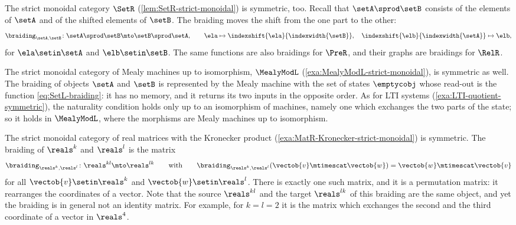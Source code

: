 \begin{example}
    \label{exa:SetR-symmetric}
    The strict monoidal category $\SetR$ (\cref{lem:SetR-strict-monoidal}) is symmetric, too.
    Recall that $\setA \sprod \setB$ consists of the elements of $\setA$ and of the shifted elements of $\setB$.
    The braiding moves the shift from the one part to the other:
    \begin{equation}
        \label{eq:SetR-braiding}
        \braiding_{\setA,\setB} \colon \setA \sprod \setB \mto \setB \sprod \setA,
        \qquad
        \ela \mapsto \indexshift{\ela}{\indexwidth{\setB}},
        \quad
        \indexshift{\elb}{\indexwidth{\setA}} \mapsto \elb,
    \end{equation}
    for $\ela \setin \setA$ and $\elb \setin \setB$.
    The same functions are also braidings for $\PreR$, and their graphs are braidings for $\RelR$.
\end{example}

\begin{example}
    \label{exa:MealyModL-symmetric}
    The strict monoidal category of Mealy machines up to isomorphism, $\MealyModL$ (\cref{exa:MealyModL-strict-monoidal}), is symmetric as well.
    The braiding of objects $\setA$ and $\setB$ is represented by the Mealy machine with the set of states $\emptycobj$ whose read-out is the function \cref{eq:SetL-braiding}: it has no memory, and it returns its two inputs in the opposite order.
    As for LTI systems (\cref{exa:LTI-quotient-symmetric}), the naturality condition holds only up to an isomorphism of machines, namely one which exchanges the two parts of the state; so it holds in $\MealyModL$, where the morphisms are Mealy machines up to isomorphism.
\end{example}

\begin{example}
    \label{exa:MatR-Kronecker-symmetric}
    The strict monoidal category of real matrices with the Kronecker product (\cref{exa:MatR-Kronecker-strict-monoidal}) is symmetric.
    The braiding of $\reals^k$ and $\reals^l$ is the matrix
    \begin{equation}
        \label{eq:MatR-Kronecker-braiding}
        \braiding_{\reals^k,\reals^l} \colon \reals^{kl} \mto \reals^{lk}
        \qquad \text{with} \qquad
        \braiding_{\reals^k,\reals^l}(\vectob{v} \mtimescat \vectob{w}) = \vectob{w} \mtimescat \vectob{v}
    \end{equation}
    for all $\vectob{v} \setin \reals^k$ and $\vectob{w} \setin \reals^l$.
    There is exactly one such matrix, and it is a permutation matrix: it rearranges the coordinates of a vector.
    Note that the source $\reals^{kl}$ and the target $\reals^{lk}$ of this braiding are the same object, and yet the braiding is in general not an identity matrix.
    For example, for $k = l = 2$ it is the matrix which exchanges the second and the third coordinate of a vector in $\reals^4$.
\end{example}

